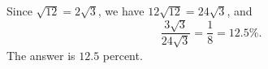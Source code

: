 Since $\sqrt{12}=2\sqrt3$, we have $12\sqrt{12}=24\sqrt3$, and
\[
\dfrac{3\sqrt3}{24\sqrt3}=\dfrac{1}{8}=12.5\%.
\]
The answer is $\boxed{12.5}$ percent.
